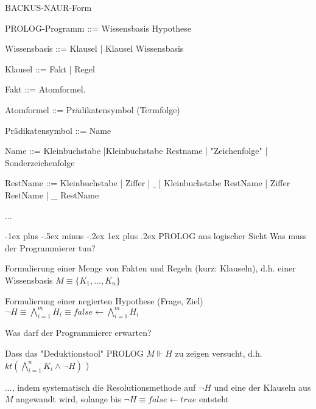 \documentclass[a4paper]{article}
\makeatletter
\renewcommand{\subsubsection}{\@startsection{subsubsection}{3}{0mm}%
                {-1ex plus -.5ex minus -.2ex}%
                {1ex plus .2ex}%
                {\normalfont\small\bfseries}}
\makeatother
\begin{document}
\begin{multicols}{3}
  BACKUS-NAUR-Form
  \begin{itemize*}
    \item PROLOG-Programm ::= Wissensbasis Hypothese
    \item Wissensbasis ::= Klausel | Klausel Wissensbasis
    \item Klausel ::= Fakt | Regel
    \item Fakt ::= Atomformel.
    \item Atomformel ::= Prädikatensymbol (Termfolge)
    \item Prädikatensymbol ::= Name
    \item Name ::= Kleinbuchstabe |Kleinbuchstabe Restname | "Zeichenfolge" | Sonderzeichenfolge
    \item RestName ::= Kleinbuchstabe | Ziffer | $\_$ | Kleinbuchstabe RestName | Ziffer RestName | \_ RestName
    \item ...
  \end{itemize*}

  \subsubsection{PROLOG aus logischer Sicht}
  Was muss der Programmierer tun?
  \begin{itemize*}
    \item Formulierung einer Menge von Fakten und Regeln (kurz: Klauseln), d.h. einer Wissensbasis $M\equiv\{K_1,...,K_n\}$
    \item Formulierung einer negierten Hypothese (Frage, Ziel) $\lnot H\equiv\bigwedge_{i=1}^m H_i \equiv false\leftarrow \bigwedge_{i=1}^m H_i$
  \end{itemize*}

  Was darf der Programmierer erwarten?
  \begin{itemize*}
    \item Dass das "Deduktionstool" PROLOG $M \Vdash H$ zu zeigen versucht, d.h. $kt(\bigwedge_{i=1}^n K_i\wedge \lnot H)$ )
    \item ..., indem systematisch die Resolutionsmethode auf $\lnot H$ und eine der Klauseln aus $M$ angewandt wird, solange bis $\lnot H\equiv false\leftarrow true$ entsteht
  \end{itemize*}


\end{multicols}
\end{document}
